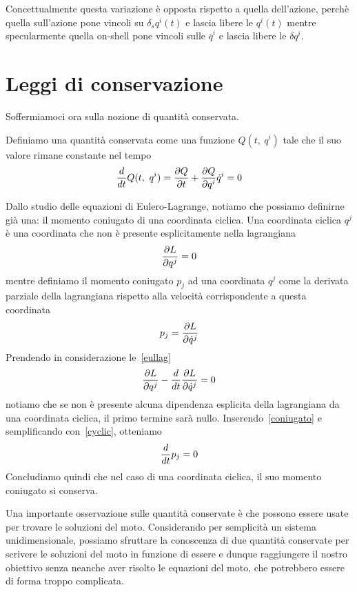     Concettualmente questa variazione è opposta rispetto a quella dell'azione, perchè quella sull'azione pone vincoli su $\delta_s q^i(t)$ e lascia libere le $q^i(t)$ mentre specularmente quella on-shell pone vincoli sulle $\overline q^i$ e lascia libere le $\delta q^i$.

\section{Leggi di conservazione}
    Soffermiamoci ora sulla nozione di quantità conservata. 
    \begin{definition}
        Definiamo una quantità conservata come una funzione $Q(t, ~q^i)$ tale che il suo valore rimane constante nel tempo
    \begin{equation} \label{th}
        \frac{d}{dt} Q(t, ~q^i) = \frac{\partial Q}{\partial t} + \frac{\partial Q}{\partial q^i} \dot q^i = 0
    \end{equation}
    \end{definition} 

    Dallo studio delle equazioni di Eulero-Lagrange, notiamo che possiamo definirne già una: il momento coniugato di una coordinata ciclica. Una coordinata ciclica $q^j$ è una coordinata che non è presente esplicitamente nella lagrangiana
    \begin{equation} \label{cyclic}
        \frac{\partial L}{\partial q^j} = 0
    \end{equation}
    mentre definiamo il momento coniugato $p_j$ ad una coordinata $q^j$ come la derivata parziale della lagrangiana rispetto alla velocità corrispondente a questa coordinata
    \begin{equation} \label{coniugato}
        p_j = \frac{\partial L}{\partial\dot q^j}
    \end{equation}
    Prendendo in considerazione le~\eqref{eullag}
    \begin{equation*}
        \frac{\partial L}{\partial q^j}  - \frac{d}{dt} \frac{\partial L}{\partial\dot q^j} = 0
    \end{equation*}
    notiamo che se non è presente alcuna dipendenza esplicita della lagrangiana da una coordinata ciclica, il primo termine sarà nullo. Inserendo~\eqref{coniugato} e semplificando con~\eqref{cyclic}, otteniamo
    \begin{equation*}
        \frac{d}{dt} p_j = 0
    \end{equation*}
    Concludiamo quindi che nel caso di una coordinata ciclica, il suo momento coniugato si conserva. 

    Una importante osservazione sulle quantità conservate è che possono essere usate per trovare le soluzioni del moto. Considerando per semplicità un sistema unidimensionale, possiamo sfruttare la conoscenza di due quantità conservate per scrivere le soluzioni del moto in funzione di essere e dunque raggiungere il nostro obiettivo senza neanche aver risolto le equazioni del moto, che potrebbero essere di forma troppo complicata. 

